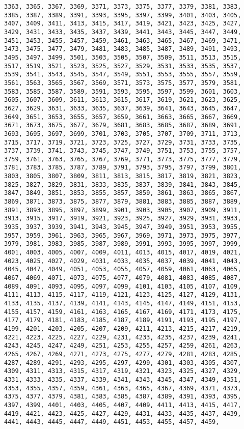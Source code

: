 \documentclass[11pt]{article}
\begin{document}
\begin{Verbatim}[commandchars=\\\{\}]
3363, 3365, 3367, 3369, 3371, 3373, 3375, 3377, 3379, 3381, 3383, 3385, 3387, 3389, 3391, 3393, 3395, 3397, 3399, 3401, 3403, 3405, 3407, 3409, 3411, 3413, 3415, 3417, 3419, 3421, 3423, 3425, 3427, 3429, 3431, 3433, 3435, 3437, 3439, 3441, 3443, 3445, 3447, 3449, 3451, 3453, 3455, 3457, 3459, 3461, 3463, 3465, 3467, 3469, 3471, 3473, 3475, 3477, 3479, 3481, 3483, 3485, 3487, 3489, 3491, 3493, 3495, 3497, 3499, 3501, 3503, 3505, 3507, 3509, 3511, 3513, 3515, 3517, 3519, 3521, 3523, 3525, 3527, 3529, 3531, 3533, 3535, 3537, 3539, 3541, 3543, 3545, 3547, 3549, 3551, 3553, 3555, 3557, 3559, 3561, 3563, 3565, 3567, 3569, 3571, 3573, 3575, 3577, 3579, 3581, 3583, 3585, 3587, 3589, 3591, 3593, 3595, 3597, 3599, 3601, 3603, 3605, 3607, 3609, 3611, 3613, 3615, 3617, 3619, 3621, 3623, 3625, 3627, 3629, 3631, 3633, 3635, 3637, 3639, 3641, 3643, 3645, 3647, 3649, 3651, 3653, 3655, 3657, 3659, 3661, 3663, 3665, 3667, 3669, 3671, 3673, 3675, 3677, 3679, 3681, 3683, 3685, 3687, 3689, 3691, 3693, 3695, 3697, 3699, 3701, 3703, 3705, 3707, 3709, 3711, 3713, 3715, 3717, 3719, 3721, 3723, 3725, 3727, 3729, 3731, 3733, 3735, 3737, 3739, 3741, 3743, 3745, 3747, 3749, 3751, 3753, 3755, 3757, 3759, 3761, 3763, 3765, 3767, 3769, 3771, 3773, 3775, 3777, 3779, 3781, 3783, 3785, 3787, 3789, 3791, 3793, 3795, 3797, 3799, 3801, 3803, 3805, 3807, 3809, 3811, 3813, 3815, 3817, 3819, 3821, 3823, 3825, 3827, 3829, 3831, 3833, 3835, 3837, 3839, 3841, 3843, 3845, 3847, 3849, 3851, 3853, 3855, 3857, 3859, 3861, 3863, 3865, 3867, 3869, 3871, 3873, 3875, 3877, 3879, 3881, 3883, 3885, 3887, 3889, 3891, 3893, 3895, 3897, 3899, 3901, 3903, 3905, 3907, 3909, 3911, 3913, 3915, 3917, 3919, 3921, 3923, 3925, 3927, 3929, 3931, 3933, 3935, 3937, 3939, 3941, 3943, 3945, 3947, 3949, 3951, 3953, 3955, 3957, 3959, 3961, 3963, 3965, 3967, 3969, 3971, 3973, 3975, 3977, 3979, 3981, 3983, 3985, 3987, 3989, 3991, 3993, 3995, 3997, 3999, 4001, 4003, 4005, 4007, 4009, 4011, 4013, 4015, 4017, 4019, 4021, 4023, 4025, 4027, 4029, 4031, 4033, 4035, 4037, 4039, 4041, 4043, 4045, 4047, 4049, 4051, 4053, 4055, 4057, 4059, 4061, 4063, 4065, 4067, 4069, 4071, 4073, 4075, 4077, 4079, 4081, 4083, 4085, 4087, 4089, 4091, 4093, 4095, 4097, 4099, 4101, 4103, 4105, 4107, 4109, 4111, 4113, 4115, 4117, 4119, 4121, 4123, 4125, 4127, 4129, 4131, 4133, 4135, 4137, 4139, 4141, 4143, 4145, 4147, 4149, 4151, 4153, 4155, 4157, 4159, 4161, 4163, 4165, 4167, 4169, 4171, 4173, 4175, 4177, 4179, 4181, 4183, 4185, 4187, 4189, 4191, 4193, 4195, 4197, 4199, 4201, 4203, 4205, 4207, 4209, 4211, 4213, 4215, 4217, 4219, 4221, 4223, 4225, 4227, 4229, 4231, 4233, 4235, 4237, 4239, 4241, 4243, 4245, 4247, 4249, 4251, 4253, 4255, 4257, 4259, 4261, 4263, 4265, 4267, 4269, 4271, 4273, 4275, 4277, 4279, 4281, 4283, 4285, 4287, 4289, 4291, 4293, 4295, 4297, 4299, 4301, 4303, 4305, 4307, 4309, 4311, 4313, 4315, 4317, 4319, 4321, 4323, 4325, 4327, 4329, 4331, 4333, 4335, 4337, 4339, 4341, 4343, 4345, 4347, 4349, 4351, 4353, 4355, 4357, 4359, 4361, 4363, 4365, 4367, 4369, 4371, 4373, 4375, 4377, 4379, 4381, 4383, 4385, 4387, 4389, 4391, 4393, 4395, 4397, 4399, 4401, 4403, 4405, 4407, 4409, 4411, 4413, 4415, 4417, 4419, 4421, 4423, 4425, 4427, 4429, 4431, 4433, 4435, 4437, 4439, 4441, 4443, 4445, 4447, 4449, 4451, 4453, 4455, 4457, 4459, 
\end{Verbatim}
\end{document}
